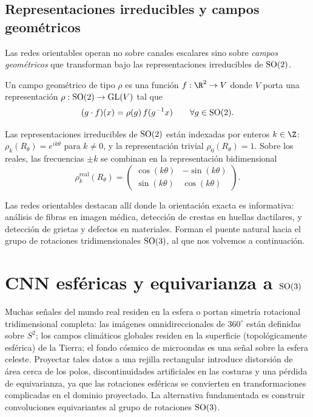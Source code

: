 \subsection{Representaciones irreducibles y campos geom\'etricos}
\label{sec:groups:irreps-fields}

Las redes orientables operan no sobre canales escalares sino sobre \emph{campos
geom\'etricos} que transforman bajo las representaciones irreducibles de
$\operatorname{SO}(2)$.

\begin{definition}
\label{def:groups:geometric-field}
Un campo geom\'etrico de tipo $\rho$ es una funci\'on $f: \R^2 \to V$ donde $V$
porta una representaci\'on $\rho: \operatorname{SO}(2) \to \operatorname{GL}(V)$ tal que
\begin{equation}
  (g \cdot f)(x) = \rho(g)\, f(g^{-1} x) \qquad \forall g \in \operatorname{SO}(2).
\end{equation}
\end{definition}

\begin{definition}
\label{def:groups:so2-irreps}
Las representaciones irreducibles de $\operatorname{SO}(2)$ est\'an indexadas por enteros $k \in
\Z$: $\rho_k(R_\theta) = e^{ik\theta}$ para $k \neq 0$, y la representaci\'on
trivial $\rho_0(R_\theta) = 1$. Sobre los reales, las frecuencias $\pm k$ se
combinan en la representaci\'on bidimensional
\begin{equation}
  \rho_k^{\text{real}}(R_\theta) = \begin{pmatrix}
    \cos(k\theta) & -\sin(k\theta) \\
    \sin(k\theta) & \cos(k\theta) \end{pmatrix}.
\end{equation}
\end{definition}

Las redes orientables destacan all\'i donde la orientaci\'on exacta es
informativa: an\'alisis de fibras en imagen m\'edica, detecci\'on de crestas en
huellas dactilares, y detecci\'on de grietas y defectos en materiales. Forman el
puente natural hacia el grupo de rotaciones tridimensionales $\operatorname{SO}(3)$, al que
nos volvemos a continuaci\'on.

\section{CNN esf\'ericas y equivarianza a $\operatorname{SO}(3)$}
\label{sec:groups:spherical}

Muchas se\~nales del mundo real residen en la esfera o portan simetr\'ia
rotacional tridimensional completa: las im\'agenes omnidireccionales de
$360^\circ$ est\'an definidas sobre $S^2$; los campos clim\'aticos globales
residen en la superficie (topol\'ogicamente esf\'erica) de la Tierra; el fondo
c\'osmico de microondas es una se\~nal sobre la esfera celeste. Proyectar tales
datos a una rejilla rectangular introduce distorsi\'on de \'area cerca de los
polos, discontinuidades artificiales en las costuras y una p\'erdida de
equivarianza, ya que las rotaciones esf\'ericas se convierten en transformaciones
complicadas en el dominio proyectado. La alternativa fundamentada es construir
convoluciones equivariantes al grupo de rotaciones $\operatorname{SO}(3)$.

